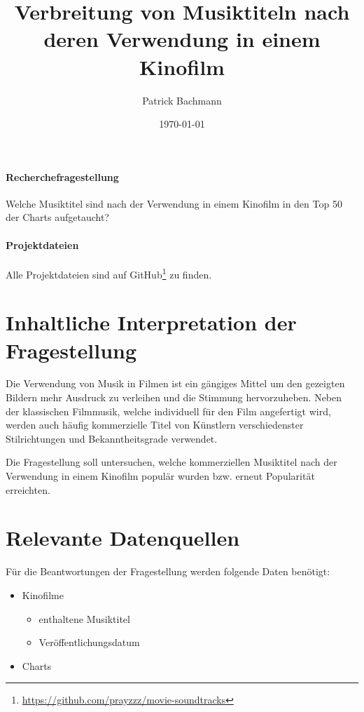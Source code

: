 \documentclass[parskip]{scrartcl}
\begin{document}
\subject{Projektdokumentation im Modul Semantic Web}

\title{Verbreitung von Musiktiteln nach deren Verwendung in einem Kinofilm}

\author{Patrick Bachmann}

\date{\today}

\maketitle

\paragraph{Recherchefragestellung}

Welche Musiktitel sind nach der Verwendung in einem Kinofilm in den Top 50 der Charts aufgetaucht?

\paragraph{Projektdateien} Alle Projektdateien sind auf GitHub\footnote{\href{https://github.com/prayzzz/movie-soundtracks}{https://github.com/prayzzz/movie-soundtracks}} zu finden.

\section{Inhaltliche Interpretation der Fragestellung}

Die Verwendung von Musik in Filmen ist ein gängiges Mittel um den gezeigten Bildern mehr Ausdruck zu verleihen und die Stimmung hervorzuheben. Neben der klassischen Filmmusik, welche individuell für den Film angefertigt wird, werden auch häufig kommerzielle Titel von Künstlern verschiedenster Stilrichtungen und Bekanntheitsgrade verwendet.

Die Fragestellung soll untersuchen, welche kommerziellen Musiktitel nach der Verwendung in einem Kinofilm populär wurden bzw. erneut Popularität erreichten.

\pagebreak
\section{Relevante Datenquellen}

Für die Beantwortungen der Fragestellung werden folgende Daten benötigt:
\begin{itemize}
    \itemsep 1pt
    \parskip 0pt
    \parsep 0pt
    \item Kinofilme
    \begin{itemize}
            \item enthaltene Musiktitel
            \item Veröffentlichungsdatum
    \end{itemize}
        \item Charts
\end{itemize}
\end{document}
